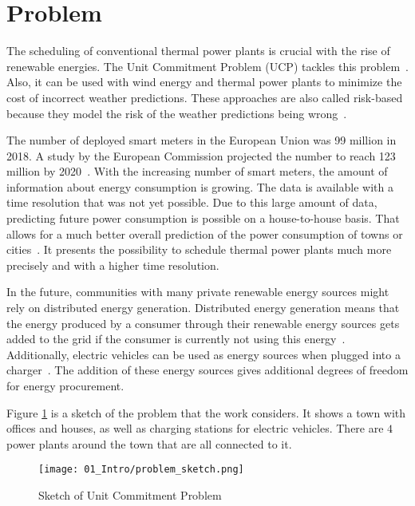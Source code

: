\section{Problem}

The scheduling of conventional thermal power plants is crucial with the rise of renewable energies.
The Unit Commitment Problem (UCP) tackles this problem~\cite{Banos2011}.
Also, it can be used with wind energy and thermal power plants to minimize the cost of incorrect weather predictions.
These approaches are also called risk-based because they model the risk of the weather predictions being wrong~\cite{Chen2008, Abujarad2017}.

The number of deployed smart meters in the European Union was 99 million in 2018.
A study by the European Commission projected the number to reach 123 million by 2020~\cite{Vlachogiannis2019}.
With the increasing number of smart meters, the amount of information about energy consumption is growing.
The data is available with a time resolution that was not yet possible.
Due to this large amount of data, predicting future power consumption is possible on a house-to-house basis.
That allows for a much better overall prediction of the power consumption of towns or cities~\cite{Aiello2016, Basu2013}.
It presents the possibility to schedule thermal power plants much more precisely and with a higher time resolution.

In the future, communities with many private renewable energy sources might rely on distributed energy generation.
Distributed energy generation means that the energy produced by a consumer through their renewable energy sources gets added to the grid if the consumer is currently not using this energy~\cite{Aiello2016}.
Additionally, electric vehicles can be used as energy sources when plugged into a charger~\cite{Zhang2016}.
The addition of these energy sources gives additional degrees of freedom for energy procurement.

Figure \ref{figure:problem.sketch} is a sketch of the problem that the work considers.
It shows a town with offices and houses, as well as charging stations for electric vehicles.
There are $4$ power plants around the town that are all connected to it.

\begin{figure}[!ht]
  \centering
  \texttt{[image: 01\_Intro/problem\_sketch.png]}
  \caption{Sketch of Unit Commitment Problem}
  \label{figure:problem.sketch}
\end{figure}
